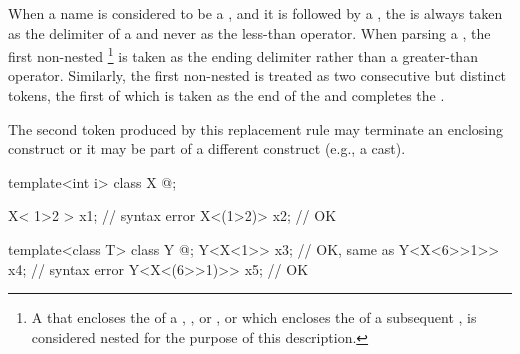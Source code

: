 \pnum
{}%
When a name is considered to be a
,
and it is followed by a \tcode{<},
the \tcode{<}
is always taken as the delimiter of a
and never as the less-than operator.
When parsing a ,
the first non-nested
\tcode{>}\footnote{A \tcode{>} that encloses the 
of a , , 
or , or which encloses the 
of a subsequent , is considered nested for the purpose
of this description.
}
is taken as the ending delimiter
rather than a greater-than operator.
Similarly, the first non-nested \tcode{>{>}} is treated as two
consecutive but distinct \tcode{>} tokens, the first of which is taken
as the end of the  and completes
the . \begin{note} The second \tcode{>}
token produced by this replacement rule may terminate an enclosing
 construct or it may be part of a different
construct (e.g., a cast).\end{note}
\begin{example}

\begin{codeblock}
template<int i> class X { @\commentellip@ };

X< 1>2 > x1;                            // syntax error
X<(1>2)> x2;                            // OK

template<class T> class Y { @\commentellip@ };
Y<X<1>> x3;                             // OK, same as 
Y<X<6>>1>> x4;                          // syntax error
Y<X<(6>>1)>> x5;                        // OK
\end{codeblock}
\end{example}

